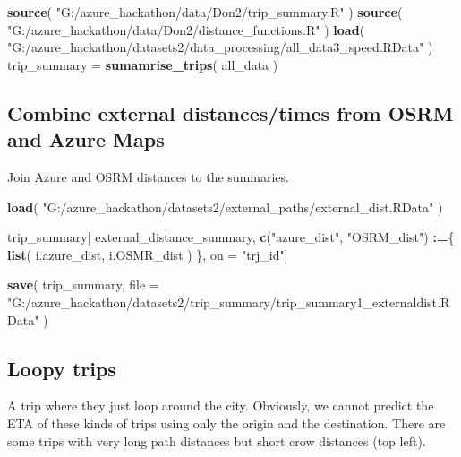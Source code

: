 \documentclass[]{article}
\newenvironment{Shaded}{\begin{snugshade}}{\end{snugshade}}
\newcommand{\DataTypeTok}[1]{\textcolor[rgb]{0.13,0.29,0.53}{#1}}
\newcommand{\ErrorTok}[1]{\textcolor[rgb]{0.64,0.00,0.00}{\textbf{#1}}}
\newcommand{\KeywordTok}[1]{\textcolor[rgb]{0.13,0.29,0.53}{\textbf{#1}}}
\newcommand{\NormalTok}[1]{#1}
\newcommand{\OperatorTok}[1]{\textcolor[rgb]{0.81,0.36,0.00}{\textbf{#1}}}
\newcommand{\StringTok}[1]{\textcolor[rgb]{0.31,0.60,0.02}{#1}}
\begin{document}
\begin{Shaded}
\begin{Highlighting}[]
\KeywordTok{source}\NormalTok{( }\StringTok{"G:/azure_hackathon/data/Don2/trip_summary.R"}\NormalTok{ )}
\KeywordTok{source}\NormalTok{( }\StringTok{"G:/azure_hackathon/data/Don2/distance_functions.R"}\NormalTok{ )}
\KeywordTok{load}\NormalTok{( }\StringTok{"G:/azure_hackathon/datasets2/data_processing/all_data3_speed.RData"}\NormalTok{ )}
\NormalTok{trip_summary =}\StringTok{ }\KeywordTok{sumamrise_trips}\NormalTok{( all_data )}
\end{Highlighting}
\end{Shaded}

\hypertarget{combine-external-distancestimes-from-osrm-and-azure-maps}{%
\subsection{Combine external distances/times from OSRM and Azure
Maps}\label{combine-external-distancestimes-from-osrm-and-azure-maps}}

Join Azure and OSRM distances to the summaries.

\begin{Shaded}
\begin{Highlighting}[]
\KeywordTok{load}\NormalTok{( }\StringTok{"G:/azure_hackathon/datasets2/external_paths/external_dist.RData"}\NormalTok{ )}

\NormalTok{trip_summary[ external_distance_summary,}
    \KeywordTok{c}\NormalTok{(}\StringTok{"azure_dist"}\NormalTok{, }\StringTok{"OSRM_dist"}\NormalTok{) }\OperatorTok{:}\ErrorTok{=}\NormalTok{\{}
        \KeywordTok{list}\NormalTok{( i.azure_dist, i.OSMR_dist )}
\NormalTok{    \},}
\NormalTok{    on =}\StringTok{ "trj_id"}\NormalTok{]}

\KeywordTok{save}\NormalTok{( trip_summary, }
    \DataTypeTok{file =} \StringTok{"G:/azure_hackathon/datasets2/trip_summary/trip_summary1_externaldist.RData"}\NormalTok{ )}
\end{Highlighting}
\end{Shaded}

\hypertarget{loopy-trips}{%
\subsection{Loopy trips}\label{loopy-trips}}

A trip where they just loop around the city. Obviously, we cannot
predict the ETA of these kinds of trips using only the origin and the
destination. There are some trips with very long path distances but
short crow distances (top left).
\end{document}
